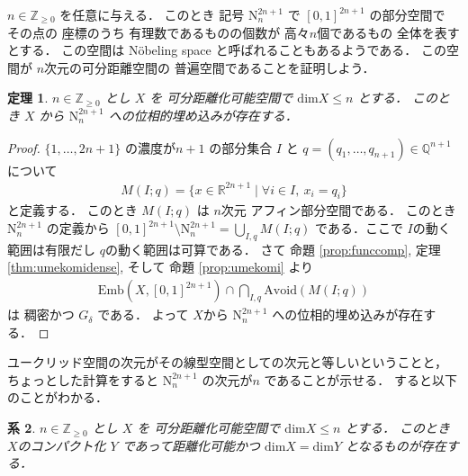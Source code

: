 \documentclass[leqno, a4paper, 12pt]{jsarticle}
\newtheorem{thm}{定理}
\newtheorem{cor}[thm]{系}
\newcommand{\zz}{\mathbb{Z}}
\newcommand{\qq}{\mathbb{Q}}
\newcommand{\rr}{\mathbb{R}}
\newcommand{\yodim}{\mathrm{dim}}
\newcommand{\yoavoid}[1]{\mathrm{Avoid}(#1)}
\newcommand{\yoemb}[2]{\mathrm{Emb}(#1, #2)}
\newcommand{\yonebsp}[1]{\mathrm{N}_{#1}^{2#1+1}}
\numberwithin{equation}{section}
\begin{document}
$n\in \zz_{\ge 0}$
を任意に与える．
このとき
記号
$\yonebsp{n}$
で
$[0, 1]^{2n+1}$
の部分空間で
その点の
座標のうち
有理数であるものの個数が
高々$n$個であるもの
全体を表すとする．
この空間は
N\"{o}beling space
と呼ばれることもあるようである．
この空間が
$n$次元の可分距離空間の
普遍空間であることを証明しよう．
\begin{thm}
$n\in \zz_{\ge 0}$
とし
$X$
を
可分距離化可能空間で
$\yodim X\le n$
とする．
このとき
$X$
から
$\yonebsp{n}$
への位相的埋め込みが存在する．
\end{thm}
\begin{proof}
$\{1, \dots, 2n+1\}$
の濃度が$n+1$
の部分集合
$I$
と
$q=(q_{1}, \dots, q_{n+1})\in \qq^{n+1}$
について
\begin{align}
M(I; q)=\{x\in \rr^{2n+1}\mid \forall i\in I, \ x_{i}=q_{i}\}
\end{align}
と定義する．
このとき
$M(I; q)$
は
$n$次元
アフィン部分空間である．
このとき
$\yonebsp{n}$
の定義から
$[0, 1]^{2n+1}\setminus \yonebsp{n}=\bigcup_{I, q}M(I; q)$
である．ここで
$I$の動く範囲は有限だし
$q$の動く範囲は可算である．
さて
命題
\ref{prop:funccomp}, 
定理
\ref{thm:umekomidense}, 
そして
命題
\ref{prop:umekomi}
より
\begin{align}
\yoemb{X}{[0, 1]^{2n+1}}\cap\bigcap_{I, q}\yoavoid{M(I; q)}
\end{align}
は
稠密かつ
$G_{\delta}$
である．
よって
$X$から
$\yonebsp{n}$
への位相的埋め込みが存在する．
\end{proof}


ユークリッド空間の次元がその線型空間としての次元と等しいということと，
ちょっとした計算をすると
$\yonebsp{n}$
の次元が$n$
であることが示せる．
すると以下のことがわかる．
\begin{cor}
$n\in \zz_{\ge 0}$
とし
$X$
を
可分距離化可能空間で
$\yodim X\le n$
とする．
このとき
$X$のコンパクト化
$Y$
であって距離化可能かつ
$\yodim X=\yodim Y$
となるものが存在する．
\end{cor}
\end{document}
